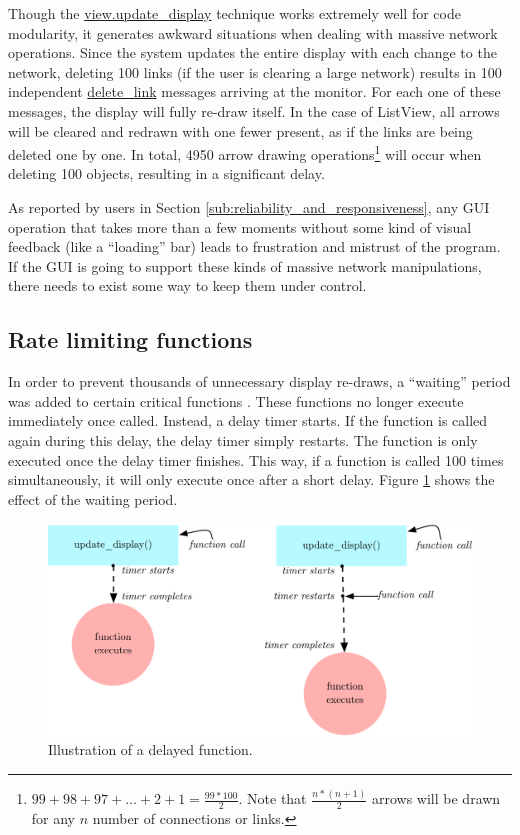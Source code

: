 Though the \url{view.update_display} technique works extremely well for code modularity, it generates awkward situations when dealing with massive network operations. Since the system updates the entire display with each change to the network, deleting 100 links (if the user is clearing a large network) results in 100 independent \url{delete_link} messages arriving at the monitor. For each one of these messages, the display will fully re-draw itself. In the case of ListView, all arrows will be cleared and redrawn with one fewer present, as if the links are being deleted one by one. In total, 4950 arrow drawing operations\footnote{$99 + 98 + 97 + ... + 2 + 1 = \frac{99*100}{2}$. Note that $\frac{n*(n+1)}{2}$ arrows will be drawn for any $n$ number of connections or links.} will occur when deleting 100 objects, resulting in a significant delay. 

As reported by users in Section \ref{sub:reliability_and_responsiveness}, any GUI operation that takes more than a few moments without some kind of visual feedback (like a ``loading'' bar) leads to frustration and mistrust of the program. If the GUI is going to support these kinds of massive network manipulations, there needs to exist some way to keep them under control.

	\subsection{Rate limiting functions} %
	\label{sub:rate_limiting_certain_functions}

In order to prevent thousands of unnecessary display re-draws, a ``waiting'' period was added to certain critical functions . These functions no longer execute immediately once called. Instead, a delay timer starts. If the function is called again during this delay, the delay timer simply restarts. The function is only executed once the delay timer finishes. This way, if a function is called 100 times simultaneously, it will only execute once after a short delay. Figure \ref{fig:waiting_period} shows the effect of the waiting period.

\begin{figure}
	\centering
		\includegraphics[width=1\textwidth]{figures/waiting_period}
		\caption{Illustration of a delayed function.}
		\label{fig:waiting_period}
\end{figure}

